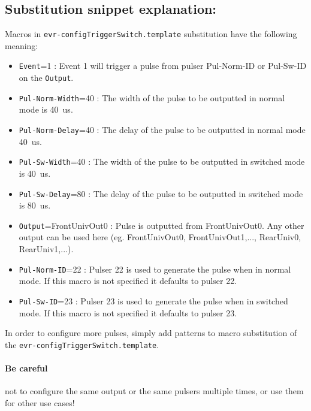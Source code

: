 \documentclass[12pt,a4paper]{article}
\begin{document}
\subsection{Substitution snippet explanation:}\label{sec:explain_2pulsers}
Macros in \texttt{evr-configTriggerSwitch.template} substitution have the following meaning:
\begin{itemize}
	\item \texttt{Event}=1 : Event 1 will trigger a pulse from pulser Pul-Norm-ID or Pul-Sw-ID on the \texttt{Output}.
	\item \texttt{Pul-Norm-Width}=40 : The width of the pulse to be outputted in normal mode is 40~us.
	\item \texttt{Pul-Norm-Delay}=40 : The delay of the pulse to be outputted in normal mode 40~us.
	\item \texttt{Pul-Sw-Width}=40 : The width of the pulse to be outputted in switched mode is 40~us.
	\item \texttt{Pul-Sw-Delay}=80 : The delay of the pulse to be outputted in switched mode is 80~us.
	\item \texttt{Output}=FrontUnivOut0 : Pulse is outputted from FrontUnivOut0. Any other output can be used here (eg. FrontUnivOut0, FrontUnivOut1,..., RearUniv0, RearUniv1,...).
	\item \texttt{Pul-Norm-ID}=22 : Pulser 22 is used to generate the pulse when in normal mode. If this macro is not specified it defaults to pulser 22.
	\item \texttt{Pul-Sw-ID}=23 : Pulser 23 is used to generate the pulse when in switched mode. If this macro is not specified it defaults to pulser 23.
\end{itemize}
In order to configure more pulses, simply add patterns to macro substitution of the \texttt{evr-configTriggerSwitch.template}.
\paragraph{Be careful} not to configure the same output or the same pulsers multiple times, or use them for other use cases!
\end{document}
